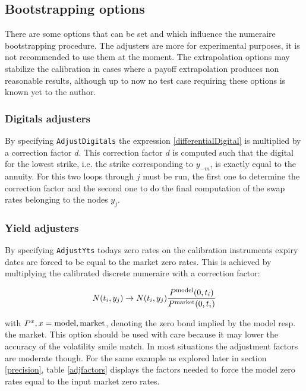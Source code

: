 \documentclass{amsart}
\theoremstyle{plain}
\numberwithin{equation}{section}
\begin{document}
\subsection{Bootstrapping options}

There are some options that can be set and which influence the numeraire bootstrapping procedure. The adjusters are more for experimental purposes, it is not recommended to use them at the moment. The extrapolation options may stabilize the calibration in cases where a payoff extrapolation produces non reasonable results, although up to now no test case requiring these options is known yet to the author.

\subsubsection{Digitals adjusters}
By specifying \verb+AdjustDigitals+ the expression \ref{differentialDigital} is multiplied by a correction factor $d$. This correction factor $d$ is computed
such that the digital for the lowest strike, i.e. the strike corresponding to $y_{-m}$, is exactly equal to the annuity. For this two loops through $j$ must
be run, the first one to determine the correction factor and the second one to do the final computation of the swap rates belonging to the nodes $y_j$.

\subsubsection{Yield adjusters}\label{yieldAdjusters}
By specifying \verb+AdjustYts+ todays zero rates on the calibration instruments expiry dates are forced to be equal to the market zero rates. This is achieved by multiplying the calibrated discrete numeraire with a correction factor:

\begin{equation}
N(t_i,y_j) \rightarrow N(t_i,y_j) \frac{P^{\textnormal{model}}(0,t_i)}{P^{\textnormal{market}}(0,t_i)}
\end{equation}

with $P^x, x=\textnormal{model}, \textnormal{market}$,  denoting the zero bond implied by the model resp. the market. This option should be used with care because it may lower the accuracy of the volatility smile match. In most situations the adjustment factors are moderate though. For the same example as explored later in section \ref{precision}, table \ref{adjfactors} displays the factors needed to force the model zero rates equal to the input market zero rates.
\end{document}
